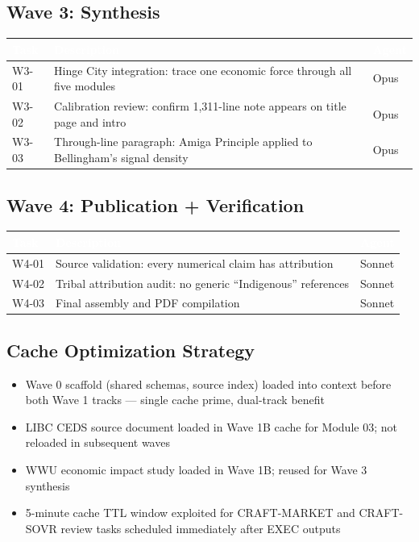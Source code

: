 \documentclass[11pt,letterpaper]{article}
\newcommand{\tableheader}[1]{\textbf{\sffamily\textcolor{white}{#1}}}
\begin{document}
\subsection{Wave 3: Synthesis}

\begin{center}
\begin{tabularx}{\textwidth}{L{2cm}XC{2cm}}
\toprule
{}
\tableheader{Task} & \tableheader{Description} & \tableheader{Agent} \\
\midrule
W3-01 & Hinge City integration: trace one economic force through all five modules & Opus \\
W3-02 & Calibration review: confirm 1,311-line note appears on title page and intro & Opus \\
W3-03 & Through-line paragraph: Amiga Principle applied to Bellingham's signal density & Opus \\
\bottomrule
\end{tabularx}
\end{center}

\subsection{Wave 4: Publication + Verification}

\begin{center}
\begin{tabularx}{\textwidth}{L{2cm}XC{2cm}}
\toprule
{}
\tableheader{Task} & \tableheader{Description} & \tableheader{Agent} \\
\midrule
W4-01 & Source validation: every numerical claim has attribution & Sonnet \\
W4-02 & Tribal attribution audit: no generic ``Indigenous'' references & Sonnet \\
W4-03 & Final assembly and PDF compilation & Sonnet \\
\bottomrule
\end{tabularx}
\end{center}

\subsection{Cache Optimization Strategy}

\begin{itemize}[leftmargin=*]
  \item Wave 0 scaffold (shared schemas, source index) loaded into context before both Wave 1 tracks --- single cache prime, dual-track benefit
  \item LIBC CEDS source document loaded in Wave 1B cache for Module 03; not reloaded in subsequent waves
  \item WWU economic impact study loaded in Wave 1B; reused for Wave 3 synthesis
  \item 5-minute cache TTL window exploited for CRAFT-MARKET and CRAFT-SOVR review tasks scheduled immediately after EXEC outputs
\end{itemize}
\end{document}
